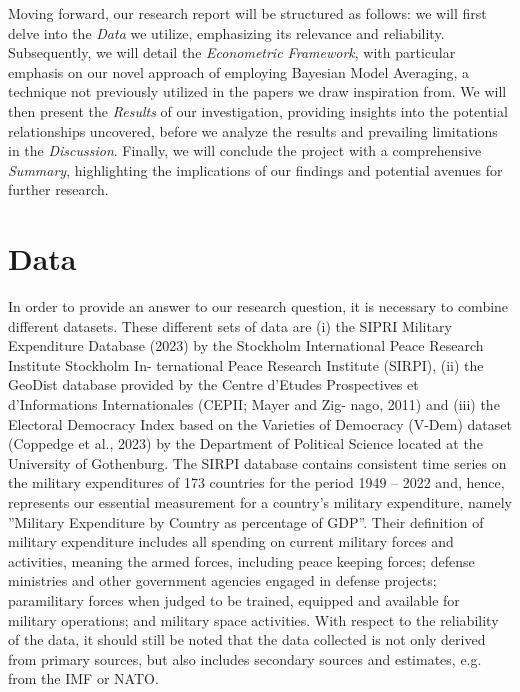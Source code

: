 \documentclass[12pt,a4paper]{article}
\begin{document}
Moving forward, our research report will be structured as follows: we will first delve into the \textit{Data} we utilize, emphasizing its relevance and reliability. Subsequently, we will detail the \textit{Econometric Framework}, with particular emphasis on our novel approach of employing Bayesian Model Averaging, a technique not previously utilized in the papers we draw inspiration from. We will then present the \textit{Results} of our investigation, providing insights into the potential relationships uncovered, before we analyze the results and prevailing limitations in the \textit{Discussion}. Finally, we will conclude the project with a comprehensive \emph{Summary},
highlighting the implications of our findings and potential avenues for further research.

\section{Data}
In order to provide an answer to our research question, it is necessary to combine different datasets. These different sets of data are (i) the SIPRI Military Expenditure Database (2023) by the Stockholm International Peace Research Institute Stockholm In- ternational Peace Research Institute (SIRPI), (ii) the GeoDist database provided by the Centre d’Etudes Prospectives et d’Informations Internationales (CEPII; Mayer and Zig- nago, 2011) and (iii) the Electoral Democracy Index based on the Varieties of Democracy (V-Dem) dataset (Coppedge et al., 2023) by the Department of Political Science located at the University of Gothenburg.
The SIRPI database contains consistent time series on the military expenditures of 173 countries for the period 1949 – 2022 and, hence, represents our essential measurement for a country’s military expenditure, namely ”Military Expenditure by Country as percentage of GDP”. Their definition of military expenditure includes all spending on current military forces and activities, meaning the armed forces, including peace keeping forces; defense ministries and other government agencies engaged in defense projects; paramilitary forces when judged to be trained, equipped and available for military operations; and military space activities. With respect to the reliability of the data, it should still be noted that the data collected is not only derived from primary sources, but also includes secondary sources and estimates, e.g. from the IMF or NATO.
\end{document}
